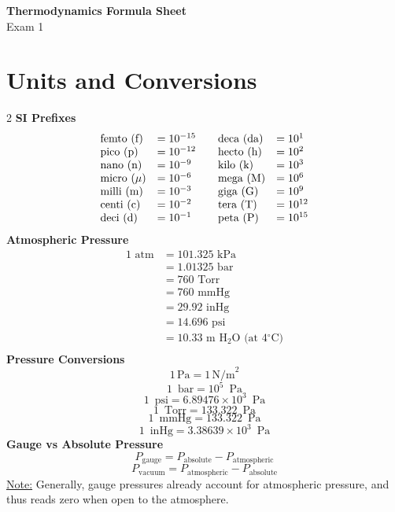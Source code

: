 \documentclass[10pt, fleqn]{article}
\begin{document}
\begin{center}
    \Large \textbf{Thermodynamics Formula Sheet} \\
    \normalsize Exam 1
\end{center}
    \section*{Units and Conversions}
    \vspace{-1em}
\begin{multicols}{2}\noindent
\textbf{SI Prefixes}
\makeatletter
\@fleqnfalse
\makeatother
\[
\begin{array}{ll@{\qquad}ll}
\text{femto (f)} &= 10^{-15} & \text{deca (da)} &= 10^{1} \\
\text{pico (p)} &= 10^{-12} & \text{hecto (h)} &= 10^{2} \\
\text{nano (n)} &= 10^{-9}  & \text{kilo (k)} &= 10^{3} \\
\text{micro ($\mu$)} &= 10^{-6} & \text{mega (M)} &= 10^{6} \\
\text{milli (m)} &= 10^{-3} & \text{giga (G)} &= 10^{9} \\
\text{centi (c)} &= 10^{-2} & \text{tera (T)} &= 10^{12} \\
\text{deci (d)} &= 10^{-1}  & \text{peta (P)} &= 10^{15}
\end{array}
\]
\makeatletter
\@fleqntrue
\makeatother
\textbf{Atmospheric Pressure}
\[\begin{aligned}
1 \text{ atm} &= 101.325 \text{ kPa} \\
&= 1.01325 \text{ bar} \\
&= 760 \text{ Torr} \\
&= 760 \text{ mmHg} \\
&= 29.92 \text{ inHg} \\
&= 14.696 \text{ psi}\\
&= 10.33 \text{ m H}_2\text{O (at 4$^\circ$C)} \\
\end{aligned}\]
\textbf{Pressure Conversions}
\[1\,\text{Pa} = 1\,\text{N/m}^2\]
\[1\, \text{ bar} = 10^{5}\, \text{ Pa}\]
\[1\, \text{ psi} = 6.89476 \times 10^{3}\, \text{ Pa}\]
\[1\, \text{ Torr} = 133.322\, \text{ Pa}\]
\[1\, \text{ mmHg} = 133.322\, \text{ Pa}\]
\[1\, \text{ inHg} = 3.38639 \times 10^{3}\, \text{ Pa}\]
\textbf{Gauge vs Absolute Pressure}
\[P_{\text{gauge}} = P_{\text{absolute}} - P_{\text{atmospheric}}\]
\[P_{\text{vacuum}} = P_{\text{atmospheric}} - P_{\text{absolute}}\]
\underline{Note:} Generally, gauge pressures already account for atmospheric pressure, and thus reads zero when open to the atmosphere.\\

\end{multicols}
\end{document}

